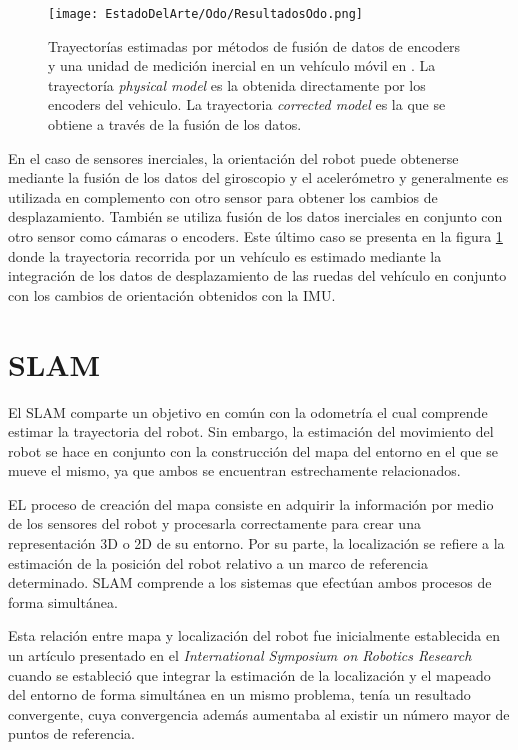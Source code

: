 \begin{figure}[H]
	\centering
	\texttt{[image: EstadoDelArte/Odo/ResultadosOdo.png]}
	\caption{Trayectorías estimadas por métodos de fusión de datos de encoders y una unidad de medición inercial en un vehículo móvil en \cite{odo}. La trayectoría \textit{physical model} es la obtenida directamente por los encoders del vehiculo. La trayectoria \textit{corrected model} es la que se obtiene a través de la fusión de los datos.}
	\label{fig:OdoEstimacion}
\end{figure}

En el caso de sensores inerciales, la orientación del robot puede obtenerse mediante la fusión de los datos del giroscopio y el acelerómetro y generalmente es utilizada en complemento con otro sensor para obtener los cambios de desplazamiento. También se utiliza fusión de los datos inerciales en conjunto con otro sensor como cámaras o encoders. Este último caso se presenta en la figura \ref{fig:OdoEstimacion} donde la trayectoria recorrida por un vehículo es estimado mediante la integración de los datos de desplazamiento de las ruedas del vehículo en conjunto con los cambios de orientación obtenidos con la IMU.

\section{SLAM}

El SLAM comparte un objetivo en común con la odometría el cual comprende estimar la trayectoria del robot. Sin embargo, la estimación  del movimiento del robot se hace en conjunto con la construcción del mapa del entorno en el que se mueve el mismo, ya que ambos se encuentran estrechamente relacionados.

EL proceso de creación del mapa consiste en adquirir la información por medio de los sensores del robot y procesarla correctamente para crear una representación 3D o 2D de su entorno. Por su parte, la localización se refiere a la estimación de la posición del robot relativo a un marco de referencia determinado. SLAM comprende a los sistemas que efectúan ambos procesos de forma simultánea.

Esta relación entre mapa  y localización del robot  fue inicialmente establecida en un artículo presentado en el \textit{International Symposium on Robotics Research} \cite{HarrisAndStephens} cuando se estableció que integrar la estimación de la localización y el mapeado del entorno de forma simultánea en un mismo problema, tenía un resultado convergente, cuya convergencia además aumentaba al existir un número mayor de puntos de referencia. 


